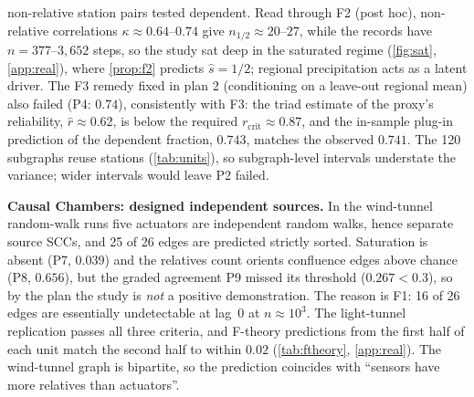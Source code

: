 \documentclass[pdflatex,sn-apa]{sn-jnl}
\theoremstyle{thmstyleone}
\theoremstyle{thmstylethree}
\theoremstyle{thmstyletwo}
\newcommand{\nhalf}{n_{1/2}}
\begin{document}
non-relative station pairs tested dependent. Read through F2 (post hoc),
non-relative correlations $\kappa\approx0.64$--$0.74$ give
$\nhalf\approx20$--$27$, while the records have $n=377$--$3{,}652$ steps, so the
study sat deep in the saturated regime (\cref{fig:sat}, \cref{app:real}),
where \cref{prop:f2} predicts $\hat s=1/2$; regional precipitation acts as a
latent driver. The F3 remedy fixed in plan 2 (conditioning on a leave-out
regional mean) also failed (P4: $0.74$), consistently with F3: the triad
estimate of the proxy's reliability, $\hat r\approx0.62$, is below the required
$r_{\mathrm{crit}}\approx0.87$, and the in-sample plug-in prediction of the
dependent fraction, $0.743$, matches the observed $0.741$. The 120 subgraphs
reuse stations (\cref{tab:units}), so subgraph-level intervals understate the
variance; wider intervals would leave P2 failed.

\textbf{Causal Chambers: designed independent sources.} In the wind-tunnel
random-walk runs \citep{gamella2025chambers} five actuators are independent
random walks, hence separate source SCCs, and 25 of 26 edges are predicted
strictly sorted. Saturation is absent (P7, $0.039$) and the relatives count
orients confluence edges above chance (P8, $0.656$), but the graded agreement
P9 missed its threshold ($0.267<0.3$), so by the plan the study is \emph{not}
a positive demonstration. The reason is F1: 16 of 26 edges are essentially
undetectable at lag~0 at $n\approx10^3$. The light-tunnel replication passes
all three criteria, and F-theory predictions from the first half of each unit
match the second half to within $0.02$ (\cref{tab:ftheory}, \cref{app:real}).
The wind-tunnel graph is bipartite, so the prediction coincides with
``sensors have more relatives than actuators''.
\end{document}
